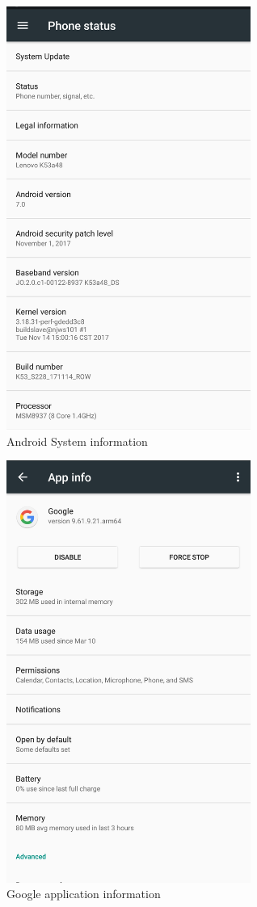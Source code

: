 \documentclass[
  digital, %
  oneside, %
  table,   %
  lof,     %
  lot,     %
]{fithesis3}
\begin{document}
\begin{figure}[H]
  \begin{center}
    \includegraphics[width=8cm]{pictures/android_info[1].jpeg}
  \end{center}
  \caption{Android System information}
  \label{fig:android_info2}
\end{figure}

\begin{figure}[H]
  \begin{center}
    \includegraphics[width=8cm]{pictures/google_application_info[1].jpeg}
  \end{center}
  \caption{Google application information}
  \label{fig:google_app_info}
\end{figure}
\end{document}
